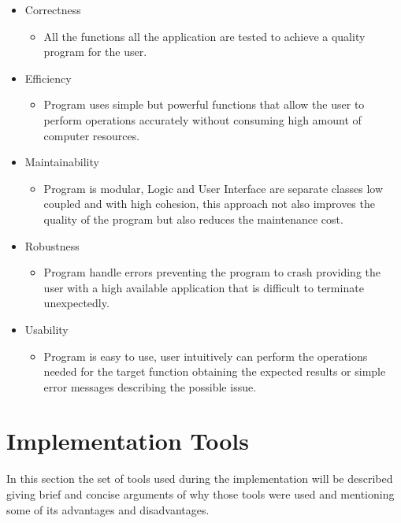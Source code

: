 \documentclass[12pt]{article}
\begin{document}
\begin{itemize}
\item Correctness
\begin{itemize}
\item All the functions all the application are tested to achieve a quality program for the user.
\end{itemize}
\pagebreak
\item Efficiency
\begin{itemize}
\item Program uses simple but powerful functions that allow the user to perform operations accurately without consuming high amount of computer resources.
\end{itemize}

\item Maintainability
\begin{itemize}

\item Program is modular, Logic and User Interface are separate classes low coupled and with high cohesion, this approach not also improves the quality of the program but also reduces the maintenance cost.
\end{itemize}
\item Robustness
\begin{itemize}

\item Program handle errors preventing the program to crash providing the user with a high available application that is difficult to terminate unexpectedly.
\end{itemize}

\item Usability
\begin{itemize}

\item Program is easy to use, user intuitively can perform the operations needed for the target function obtaining the expected results or simple error messages describing the possible issue. 
\end{itemize}
\end{itemize}

\noindent


\section{Implementation Tools}
In this section the set of tools used during the implementation will be described giving brief and concise arguments of why those tools were used and mentioning some of its advantages and disadvantages.   
\end{document}
